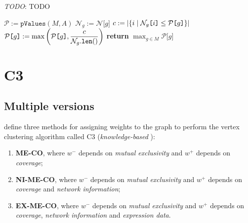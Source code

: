 \begin{algorithm}[H]
    \caption{
        \textit{TODO}: TODO
    }

        \label{score_mutex}
    \begin{algorithmic}[1]
            \State $\mathcal P := \texttt{pValues}(M, A)$
             
                    \State $\mathcal N_g := \mathcal N\texttt{[}g\texttt{]}$
                    \State $c := \left|\{i \mid \mathcal N_g\texttt{[}i\texttt{]} \le \mathcal P \texttt{[}g\texttt{]}\}\right|$
                    \State $\mathcal P\texttt{[}g\texttt{]} := \max\left(\mathcal P\texttt{[}g\texttt{]}, \dfrac{c}{\mathcal N_g.\texttt{len}()}\right)$
                \EndFor
            \EndIf
            \State \textbf{return} $\max_{g \in M}{\mathcal P\texttt{[}g\texttt{]}}$ 
        \EndFunction
    \end{algorithmic}
\end{algorithm}

\section{C3}

\subsection{Multiple versions}

\textcite{c3} define three methods for assigning weights to the graph to perform the vertex clustering algorithm called C3 (\textit{knowledge-based} \cite{survey}):

\begin{enumerate}
    \item \textbf{ME-CO}, where $w^-$ depends on \textit{mutual exclusivity} and $w^+$ depends on \textit{coverage};
    \item \textbf{NI-ME-CO}, where $w^-$ depends on \textit{mutual exclusivity} and $w^+$ depends on \textit{coverage} and \textit{network information};
    \item \textbf{EX-ME-CO}, where $w^-$ depends on \textit{mutual exclusivity} and $w^+$ depends on \textit{coverage}, \textit{network information} and \textit{expression data}.
\end{enumerate}

